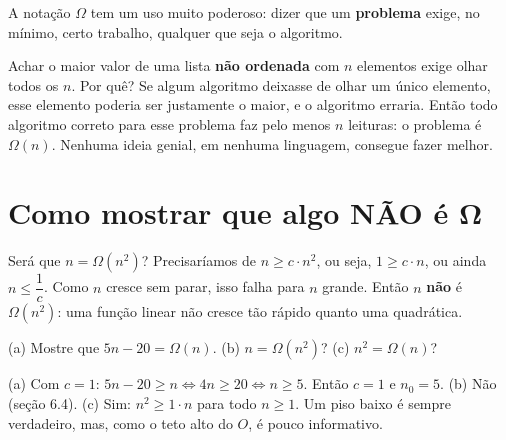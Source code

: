 A notação $\Omega$ tem um uso muito poderoso: dizer que um \textbf{problema} exige, no mínimo,
certo trabalho, qualquer que seja o algoritmo.

\begin{intuicao}
Achar o maior valor de uma lista \textbf{não ordenada} com $n$ elementos exige olhar todos os
$n$. Por quê? Se algum algoritmo deixasse de olhar um único elemento, esse elemento poderia ser
justamente o maior, e o algoritmo erraria. Então todo algoritmo correto para esse problema faz
pelo menos $n$ leituras: o problema é $\Omega(n)$. Nenhuma ideia genial, em nenhuma linguagem,
consegue fazer melhor.
\end{intuicao}

\section{Como mostrar que algo NÃO é Ω}

Será que $n = \Omega(n^2)$? Precisaríamos de $n \ge c \cdot n^2$, ou seja, $1 \ge c \cdot n$,
ou ainda $n \le \dfrac{1}{c}$. Como $n$ cresce sem parar, isso falha para $n$ grande. Então
$n$ \textbf{não} é $\Omega(n^2)$: uma função linear não cresce tão rápido quanto uma quadrática.

\begin{exrapido}
(a) Mostre que $5n - 20 = \Omega(n)$. (b) $n = \Omega(n^2)$? (c) $n^2 = \Omega(n)$?
\end{exrapido}

\begin{respostas}
   (a) Com $c = 1$: $5n - 20 \ge n \Longleftrightarrow 4n \ge 20 \Longleftrightarrow n \ge 5$.
  Então $c = 1$ e $n_0 = 5$. (b) Não (seção 6.4). (c) Sim: $n^2 \ge 1 \cdot n$ para todo $n \ge 1$.
  Um piso baixo é sempre verdadeiro, mas, como o teto alto do $O$, é pouco informativo.
\end{respostas}
